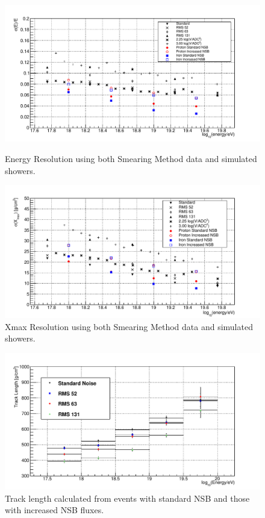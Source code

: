 \begin{figure}
\centering
\includegraphics[width=\textwidth]{chapters/graphs/SelectionEff/Combined_EnergyRes_All.pdf}
\caption{Energy Resolution using both Smearing Method data and simulated showers.}
\vspace{3mm}
\includegraphics[width=\textwidth]{chapters/graphs/SelectionEff/Combined_XmaxRes_All.pdf}
\caption{Xmax Resolution using both Smearing Method data and simulated showers.}
\end{figure}

\begin{figure}
\centering
\includegraphics[width=\textwidth]{chapters/graphs/SelectionEff/Smearing_TrackLength_DiffNSBlevels.pdf}
\caption{Track length calculated from events with standard NSB and those with increased NSB fluxes.} \label{fig:TrackLength_Smearing}
\end{figure}

